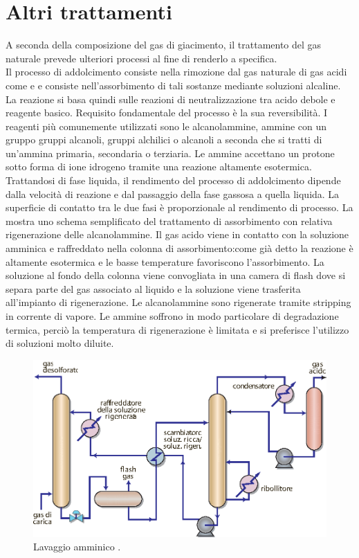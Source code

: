 \section{Altri trattamenti}
A seconda della composizione del gas di giacimento, il trattamento del gas naturale prevede ulteriori processi al fine di renderlo a specifica. \\
Il processo di addolcimento consiste nella rimozione dal gas naturale di gas acidi come  e  e consiste nell'assorbimento di tali sostanze mediante soluzioni alcaline. La reazione si basa quindi sulle reazioni di neutralizzazione tra acido debole e reagente basico. Requisito fondamentale del processo è la sua reversibilità. 
I reagenti più comunemente utilizzati sono le alcanolammine, ammine con un gruppo gruppi alcanoli, gruppi alchilici o alcanoli a seconda che si tratti di un'ammina primaria, secondaria o terziaria. Le ammine accettano un protone sotto forma di ione idrogeno  tramite una reazione altamente esotermica. Trattandosi di fase liquida, il rendimento del processo di addolcimento dipende dalla velocità di reazione e dal passaggio della fase gassosa a quella liquida. La superficie di contatto tra le due fasi è proporzionale al rendimento di processo. La  mostra uno schema semplificato del trattamento di assorbimento con relativa rigenerazione delle alcanolammine. Il gas acido viene in contatto con la soluzione amminica e raffreddato nella colonna di assorbimento:come già detto la reazione è altamente esotermica e le basse temperature favoriscono l'assorbimento. La soluzione al fondo della colonna viene convogliata in una camera di flash dove si separa parte del gas associato al liquido e la soluzione viene trasferita all'impianto di rigenerazione. Le alcanolammine sono rigenerate tramite stripping in corrente di vapore. Le ammine soffrono in modo particolare di degradazione termica, perciò la temperatura di rigenerazione è limitata e si preferisce l'utilizzo di soluzioni molto diluite.\\
\begin{figure}[htbp]
    \centering
    \includegraphics[width=.7\textwidth]{fig/impianti/ammine.eps}
    \caption{Lavaggio amminico \parencite{bianco2005impiantigas}.}
    \label{fig:ammine}
\end{figure}
